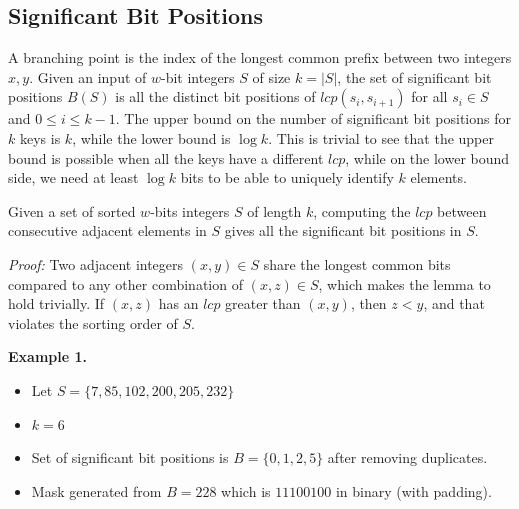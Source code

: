 \subsection{Significant Bit Positions}  A branching point is the index of the longest common prefix between two integers $x, y$. Given an input of $w$-bit integers $S$ of size $k = |S|$, the set of significant bit positions $B(S)$ is all the distinct bit positions of $lcp(s_i, s_{i+1})$ for all $s_i \in S$ and $0 \leq i \leq {k-1}$. The upper bound on the number of significant bit positions for $k$ keys is $k$, while the lower bound is $\log k$. This is trivial to see that the upper bound is possible when all the keys have a different $lcp$, while on the lower bound side, we need at least $\log k$ bits to be able to uniquely identify $k$ elements.\par
\begin{lemma}
Given a set of sorted $w$-bits integers $S$ of length $k$, computing the $lcp$ between
consecutive adjacent elements in $S$ gives all the significant bit positions in $S$.
\end{lemma}\par
\textit{Proof:}
Two adjacent integers $(x, y) \in S$ share the longest common bits compared to any other combination of $(x, z) \in S$, which makes the lemma to hold trivially. If $(x, z)$ has an $lcp$ greater than $(x, y)$, then $z < y$, and that violates the sorting order of $S$.\par
\textbf{Example 1.}
\begin{itemize}
    \item Let $S = \{ 7, 85, 102, 200, 205, 232 \}$
    \item $k = 6$
    \item Set of significant bit positions is $B = \{ 0, 1, 2, 5 \} $ after removing duplicates.
    \item Mask generated from $B = 228$ which is $11100100$ in binary (with padding).
\end{itemize}


